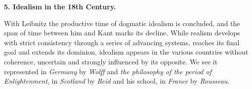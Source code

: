 \divrule

\begin{center}
  \textbf{5. Idealism in the 18th Century.}
\end{center}

With Leibnitz the productive time of dogmatic idealism is concluded, and the span of time between
him and Kant marks its decline. While realism develops with strict consistency through a
series of advancing systems, reaches its final goal and extends its dominion, idealism appears in
the various countries without coherence, uncertain and strongly influenced by its opposite. We see
it represented in \emph{Germany} by \emph{Wolff} and \emph{the philosophy of the period of
Enlightenment}, in \emph{Scotland} by \emph{Reid} and his school, in \emph{France} by
\emph{Rousseau}.

